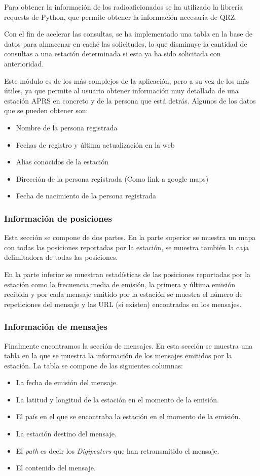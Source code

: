 Para obtener la información de los radioaficionados se ha utilizado la librería requests de Python, que permite obtener la información necesaria de QRZ.

Con el fin de acelerar las consultas, se ha implementado una tabla en la base de datos para almacenar en caché las solicitudes, lo que disminuye la cantidad de consultas a una estación determinada si esta ya ha sido solicitada con anterioridad.

Este módulo es de los más complejos de la aplicación, pero a su vez de los más útiles, ya que permite al usuario obtener información muy detallada de una estación APRS en concreto y de la persona que está detrás. Algunos de los datos que se pueden obtener son:

\begin{itemize}
	\item Nombre de la persona registrada
	\item Fechas de registro y última actualización en la web
	\item Alias conocidos de la estación
	\item Dirección de la persona registrada (Como link a google maps)
	\item Fecha de nacimiento de la persona registrada
\end{itemize}

\subsubsection*{Información de posiciones}
Esta sección se compone de dos partes. En la parte superior se muestra un mapa con todas las posiciones reportadas por la estación, se muestra también la caja delimitadora de todas las posiciones.

En la parte inferior se muestran estadísticas de las posiciones reportadas por la estación como la frecuencia media de emisión, la primera y última emisión recibida y por cada mensaje emitido por la estación se muestra el número de repeticiones del mensaje y las URL (si existen) encontradas en los mensajes.

\subsubsection*{Información de mensajes}
Finalmente encontramos la sección de mensajes. En esta sección se muestra una tabla en la que se muestra la información de los mensajes emitidos por la estación. La tabla se compone de las siguientes columnas:
\begin{itemize}
	\item La fecha de emisión del mensaje.
	\item La latitud y longitud de la estación en el momento de la emisión.
	\item El país en el que se encontraba la estación en el momento de la emisión.
	\item La estación destino del mensaje.
	\item El \textit{path} es decir los \textit{Digipeaters} que han retransmitido el mensaje.
	\item El contenido del mensaje.
\end{itemize}

